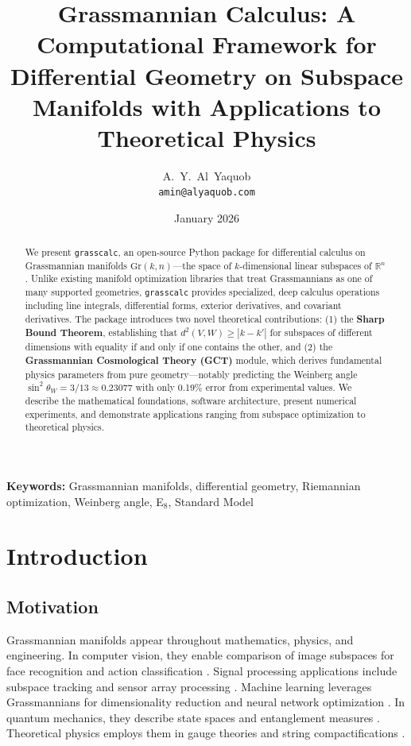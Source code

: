 \documentclass[11pt,a4paper]{article}
\title{\textbf{Grassmannian Calculus}: A Computational Framework for Differential Geometry on Subspace Manifolds with Applications to Theoretical Physics}
\author{
    A.~Y.~Al~Yaquob\\
    \texttt{amin@alyaquob.com}
}
\date{January 2026}
\newcommand{\Gr}{\mathrm{Gr}}
\newcommand{\R}{\mathbb{R}}
\begin{document}
\maketitle

\begin{abstract}
We present \texttt{grasscalc}, an open-source Python package for differential calculus on Grassmannian manifolds $\Gr(k,n)$---the space of $k$-dimensional linear subspaces of $\R^n$. Unlike existing manifold optimization libraries that treat Grassmannians as one of many supported geometries, \texttt{grasscalc} provides specialized, deep calculus operations including line integrals, differential forms, exterior derivatives, and covariant derivatives. The package introduces two novel theoretical contributions: (1) the \textbf{Sharp Bound Theorem}, establishing that $d^2(V,W) \geq |k-k'|$ for subspaces of different dimensions with equality if and only if one contains the other, and (2) the \textbf{Grassmannian Cosmological Theory (GCT)} module, which derives fundamental physics parameters from pure geometry---notably predicting the Weinberg angle $\sin^2\theta_W = 3/13 \approx 0.23077$ with only 0.19\% error from experimental values. We describe the mathematical foundations, software architecture, present numerical experiments, and demonstrate applications ranging from subspace optimization to theoretical physics.
\end{abstract}

\textbf{Keywords:} Grassmannian manifolds, differential geometry, Riemannian optimization, Weinberg angle, E$_8$, Standard Model

\tableofcontents
\newpage

\section{Introduction}

\subsection{Motivation}

Grassmannian manifolds appear throughout mathematics, physics, and engineering. In computer vision, they enable comparison of image subspaces for face recognition and action classification \citep{turaga2011statistical}. Signal processing applications include subspace tracking and sensor array processing \citep{edelman1998geometry}. Machine learning leverages Grassmannians for dimensionality reduction and neural network optimization \citep{huang2018building}. In quantum mechanics, they describe state spaces and entanglement measures \citep{bengtsson2017geometry}. Theoretical physics employs them in gauge theories and string compactifications \citep{green1984anomaly}.
\end{document}
